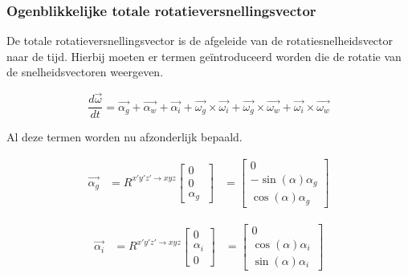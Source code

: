 \subsubsection{Ogenblikkelijke totale rotatieversnellingsvector}
De totale rotatieversnellingsvector is de afgeleide van de rotatiesnelheidsvector naar de tijd. Hierbij moeten er termen ge\"introduceerd worden die de rotatie van de snelheidsvectoren weergeven.

\begin{equation*}
\frac{d\overrightarrow{\omega}}{dt}=\overrightarrow{\alpha_{g}}+\overrightarrow{\alpha_{w}}+\overrightarrow{\alpha_{i}}+\overrightarrow{\omega_{g}}\times\overrightarrow{\omega_{i}}+\overrightarrow{\omega_{g}}\times\overrightarrow{\omega_{w}}+\overrightarrow{\omega_{i}}\times\overrightarrow{\omega_{w}}
\end{equation*}

Al deze termen worden nu afzonderlijk bepaald.

\begin{equation*}
\begin{split}
\overrightarrow{\alpha_{g}}&=R^{x'y'z' \rightarrow xyz}
	\begin{bmatrix}
	0\\
	0\\
	\alpha_{g}\
	\end{bmatrix}
	&=\begin{bmatrix}
	0\\
	-\sin(\alpha)\alpha_{g}\\
	\cos(\alpha)\alpha_{g}\
	\end{bmatrix}
\end{split}
\end{equation*}

\begin{equation*}
\begin{split}
\overrightarrow{\alpha_{i}}&=R^{x'y'z' \rightarrow xyz}
	\begin{bmatrix}
	0\\
	\alpha_{i}\\
	0\
	\end{bmatrix}
	&=\begin{bmatrix}
	0\\
	\cos(\alpha)\alpha_{i}\\
	\sin(\alpha)\alpha_{i}\
	\end{bmatrix}
\end{split}
\end{equation*}

